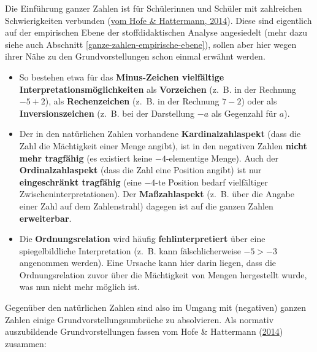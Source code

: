 \documentclass[
]{scrbook}
\providecommand{\tightlist}{%
  \setlength{\itemsep}{0pt}\setlength{\parskip}{0pt}}
\theoremstyle{definition}
\theoremstyle{definition}
\theoremstyle{definition}
\theoremstyle{definition}
\theoremstyle{remark}
\begin{document}
Die Einführung ganzer Zahlen ist für Schülerinnen und Schüler mit zahlreichen Schwierigkeiten verbunden (\protect\hyperlink{ref-vomHofe2014a}{vom Hofe \& Hattermann, 2014}). Diese sind eigentlich auf der empirischen Ebene der stoffdidaktischen Analyse angesiedelt (mehr dazu siehe auch Abschnitt \ref{ganze-zahlen-empirische-ebene}), sollen aber hier wegen ihrer Nähe zu den Grundvorstellungen schon einmal erwähnt werden.

\begin{itemize}
\tightlist
\item
  So bestehen etwa für das \textbf{Minus-Zeichen vielfältige Interpretationsmöglichkeiten} als \textbf{Vorzeichen} (z.~B. in der Rechnung \(-5+2\)), als \textbf{Rechenzeichen} (z.~B. in der Rechnung \(7-2\)) oder als \textbf{Inversionszeichen} (z.~B. bei der Darstellung \(-a\) als Gegenzahl für \(a\)).
\item
  Der in den natürlichen Zahlen vorhandene \textbf{Kardinalzahlaspekt} (dass die Zahl die Mächtigkeit einer Menge angibt), ist in den negativen Zahlen \textbf{nicht mehr tragfähig} (es existiert keine \(-4\)-elementige Menge). Auch der \textbf{Ordinalzahlaspekt} (dass die Zahl eine Position angibt) ist nur \textbf{eingeschränkt tragfähig} (eine \(-4\)-te Position bedarf vielfältiger Zwischeninterpretationen). Der \textbf{Maßzahlaspekt} (z.~B. über die Angabe einer Zahl auf dem Zahlenstrahl) dagegen ist auf die ganzen Zahlen \textbf{erweiterbar}.
\item
  Die \textbf{Ordnungsrelation} wird häufig \textbf{fehlinterpretiert} über eine spiegelbildliche Interpretation (z.~B. kann fälschlicherweise \(-5>-3\) angenommen werden). Eine Ursache kann hier darin liegen, dass die Ordnungsrelation zuvor über die Mächtigkeit von Mengen hergestellt wurde, was nun nicht mehr möglich ist.
\end{itemize}

Gegenüber den natürlichen Zahlen sind also im Umgang mit (negativen) ganzen Zahlen einige Grundvorstellungsumbrüche zu absolvieren. Als normativ auszubildende Grundvorstellungen fassen vom Hofe \& Hattermann (\protect\hyperlink{ref-vomHofe2014a}{2014}) zusammen:
\end{document}
